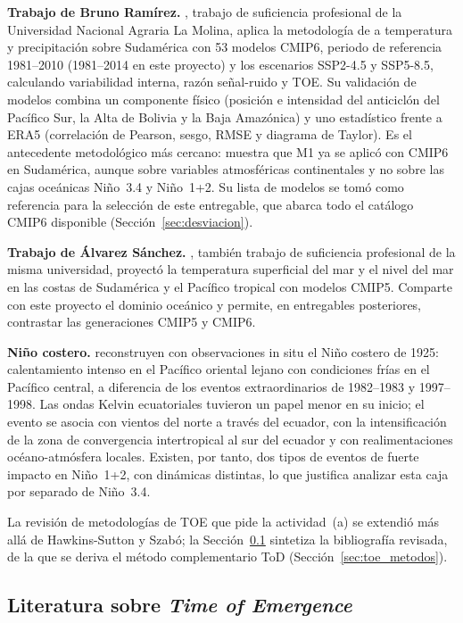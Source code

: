 \textbf{Trabajo de Bruno Ramírez.} \citet{bruno2023}, trabajo de suficiencia profesional de la Universidad Nacional Agraria La Molina, aplica la metodología de \citet{szabo2016} a temperatura y precipitación sobre Sudamérica con 53 modelos CMIP6, periodo de referencia 1981--2010 (1981--2014 en este proyecto) y los escenarios SSP2-4.5 y SSP5-8.5, calculando variabilidad interna, razón señal-ruido y TOE. Su validación de modelos combina un componente físico (posición e intensidad del anticiclón del Pacífico Sur, la Alta de Bolivia y la Baja Amazónica) y uno estadístico frente a ERA5 (correlación de Pearson, sesgo, RMSE y diagrama de Taylor). Es el antecedente metodológico más cercano: muestra que M1 ya se aplicó con CMIP6 en Sudamérica, aunque sobre variables atmosféricas continentales y no sobre las cajas oceánicas Niño~3.4 y Niño~1+2. Su lista de modelos se tomó como referencia para la selección de este entregable, que abarca todo el catálogo CMIP6 disponible (Sección~\ref{sec:desviacion}).

\textbf{Trabajo de Álvarez Sánchez.} \citet{alvarez2024}, también trabajo de suficiencia profesional de la misma universidad, proyectó la temperatura superficial del mar y el nivel del mar en las costas de Sudamérica y el Pacífico tropical con modelos CMIP5. Comparte con este proyecto el dominio oceánico y permite, en entregables posteriores, contrastar las generaciones CMIP5 y CMIP6.

\textbf{Niño costero.} \citet{takahashi2019} reconstruyen con observaciones in situ el Niño costero de 1925: calentamiento intenso en el Pacífico oriental lejano con condiciones frías en el Pacífico central, a diferencia de los eventos extraordinarios de 1982--1983 y 1997--1998. Las ondas Kelvin ecuatoriales tuvieron un papel menor en su inicio; el evento se asocia con vientos del norte a través del ecuador, con la intensificación de la zona de convergencia intertropical al sur del ecuador y con realimentaciones océano-atmósfera locales. Existen, por tanto, dos tipos de eventos de fuerte impacto en Niño~1+2, con dinámicas distintas, lo que justifica analizar esta caja por separado de Niño~3.4.

La revisión de metodologías de TOE que pide la actividad~(a) se extendió más allá de Hawkins-Sutton y Szabó; la Sección~\ref{sec:referencias} sintetiza la bibliografía revisada, de la que se deriva el método complementario ToD (Sección~\ref{sec:toe_metodos}).

\subsection{Literatura sobre \emph{Time of Emergence}}
\label{sec:referencias}

